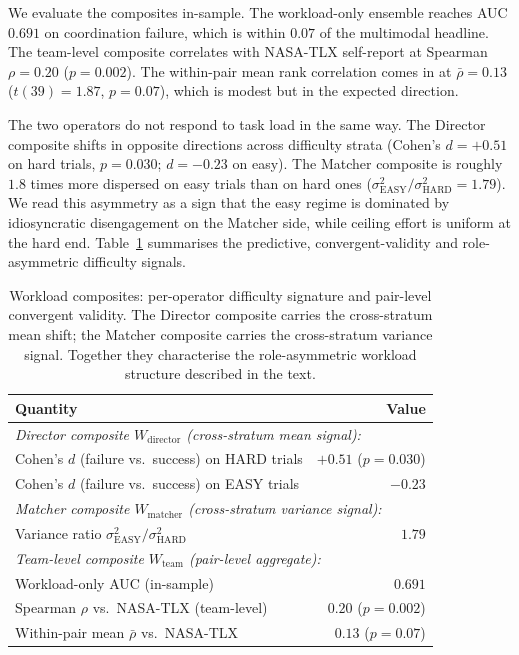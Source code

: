 We evaluate the composites in-sample. The workload-only ensemble reaches AUC $0.691$ on coordination failure, which is within $0.07$ of the multimodal headline. The team-level composite correlates with NASA-TLX self-report at Spearman $\rho = 0.20$ ($p = 0.002$). The within-pair mean rank correlation comes in at $\bar\rho = 0.13$ ($t(39) = 1.87$, $p = 0.07$), which is modest but in the expected direction.

The two operators do not respond to task load in the same way. The Director composite shifts in opposite directions across difficulty strata (Cohen's $d = +0.51$ on hard trials, $p = 0.030$; $d = -0.23$ on easy). The Matcher composite is roughly $1.8$ times more dispersed on easy trials than on hard ones ($\sigma^2_{\text{EASY}} / \sigma^2_{\text{HARD}} = 1.79$). We read this asymmetry as a sign that the easy regime is dominated by idiosyncratic disengagement on the Matcher side, while ceiling effort is uniform at the hard end. Table~\ref{tab:workload} summarises the predictive, convergent-validity and role-asymmetric difficulty signals.

\begin{table}[!t]
\caption[Workload composites]{Workload composites: per-operator difficulty signature and pair-level convergent validity. The Director composite carries the cross-stratum mean shift; the Matcher composite carries the cross-stratum variance signal. Together they characterise the role-asymmetric workload structure described in the text.}
\label{tab:workload}
\centering
\small
\begin{tabular}{lr}
\toprule
Quantity & Value \\
\midrule
\multicolumn{2}{l}{\textit{Director composite $W_{\text{director}}$ (cross-stratum mean signal):}} \\
Cohen's $d$ (failure vs.\ success) on HARD trials & $+0.51$ ($p=0.030$) \\
Cohen's $d$ (failure vs.\ success) on EASY trials & $-0.23$ \\
\midrule
\multicolumn{2}{l}{\textit{Matcher composite $W_{\text{matcher}}$ (cross-stratum variance signal):}} \\
Variance ratio $\sigma^2_{\text{EASY}}/\sigma^2_{\text{HARD}}$ & $1.79$ \\
\midrule
\multicolumn{2}{l}{\textit{Team-level composite $W_{\text{team}}$ (pair-level aggregate):}} \\
Workload-only AUC (in-sample) & $0.691$ \\
Spearman $\rho$ vs.\ NASA-TLX (team-level) & $0.20$ ($p=0.002$) \\
Within-pair mean $\bar\rho$ vs.\ NASA-TLX & $0.13$ ($p=0.07$) \\
\bottomrule
\end{tabular}
\end{table}

